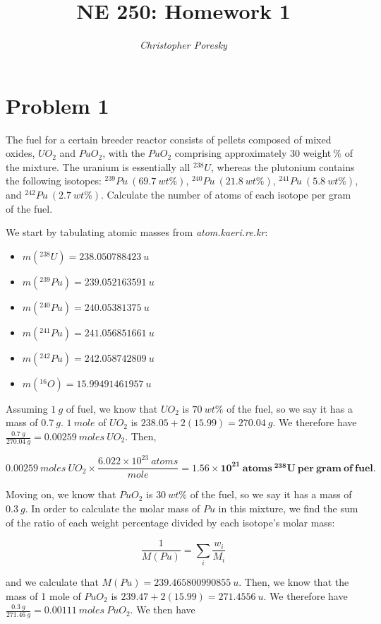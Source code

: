 \documentclass{article}
\author{\textit {Christopher Poresky}}
\title{\textbf {NE 250: Homework 1}}
\begin{document}
\maketitle
\section*{Problem 1}

The fuel for a certain breeder reactor consists of pellets composed of mixed oxides, $UO_{2}$ and
$PuO_{2}$, with the $PuO_{2}$ comprising approximately 30 weight$~\%$ of the mixture. The uranium is
essentially all $^{238}U$, whereas the plutonium contains the following isotopes: $^{239}Pu~(69.7~wt\%)$,
$^{240}Pu~(21.8~wt\%)$, $^{241}Pu~(5.8~wt\%)$, and $^{242}Pu~(2.7~wt\%)$. Calculate the number of atoms of
each isotope per gram of the fuel.

\hrulefill

We start by tabulating atomic masses from \textit{atom.kaeri.re.kr}:
\begin{itemize}
\item $m(^{238}U) = 238.050788423~u$
\item $m(^{239}Pu) = 239.052163591~u$
\item $m(^{240}Pu) = 240.05381375~u$
\item $m(^{241}Pu) = 241.056851661~u$
\item $m(^{242}Pu) = 242.058742809~u$
\item $m(^{16}O) = 15.99491461957~u$
\end{itemize}

Assuming $1~g$ of fuel, we know that $UO_{2}$ is $70~wt\%$ of the fuel, so we say it has a mass of $0.7~g$. $1~mole$ of $UO_{2}$ is $238.05 + 2(15.99) = 270.04~g$. We therefore have $\frac{0.7~g}{270.04~g} = 0.00259~moles~UO_{2}$. Then,

$$0.00259~moles~UO_{2} \times \frac{6.022 \times 10^{23}~atoms}{mole} = \mathbf{1.56 \times 10^{21}~atoms~^{238}U~per~gram~of~fuel}.$$

Moving on, we know that $PuO_{2}$ is $30~wt\%$ of the fuel, so we say it has a mass of $0.3~g$. In order to calculate the molar mass of $Pu$ in this mixture, we find the sum of the ratio of each weight percentage divided by each isotope's molar mass:

$$\frac{1}{M(Pu)} = \sum_{i} \frac{w_{i}}{M_{i}}$$

and we calculate that $M(Pu) = 239.465800990855~u$. Then, we know that the mass of 1 mole of $PuO_{2}$ is $239.47 + 2(15.99) = 271.4556~u$. We therefore have $\frac{0.3~g}{271.46~g} = 0.00111~moles~PuO_{2}$. We then have
\end{document}
